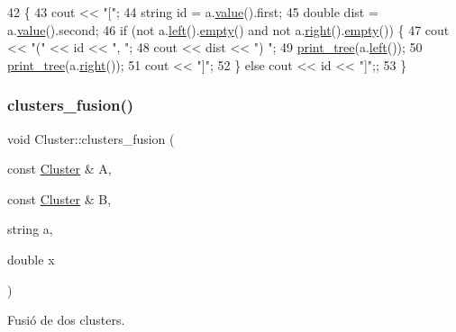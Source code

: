 \begin{DoxyCode}
42                                                              \{
43     cout << \textcolor{stringliteral}{"["};
44     \textcolor{keywordtype}{string} \textcolor{keywordtype}{id} = a.\hyperlink{class_bin_tree_a734e785b089c87b49187ee7c58edf5f3}{value}().first;
45     \textcolor{keywordtype}{double} dist = a.\hyperlink{class_bin_tree_a734e785b089c87b49187ee7c58edf5f3}{value}().second;
46     \textcolor{keywordflow}{if} (not a.\hyperlink{class_bin_tree_a82108db4c1b08d1f111027788c196d4e}{left}().\hyperlink{class_bin_tree_a74cda259ba5c25b8ee38ed4dc33e4fad}{empty}() and not a.\hyperlink{class_bin_tree_aff8e96651b27284c329667b5ad3e4d0b}{right}().\hyperlink{class_bin_tree_a74cda259ba5c25b8ee38ed4dc33e4fad}{empty}()) \{
47         cout << \textcolor{stringliteral}{"("} << \textcolor{keywordtype}{id} << \textcolor{stringliteral}{", "};
48         cout << dist << \textcolor{stringliteral}{") "};
49         \hyperlink{class_cluster_a8343114bf709fe49b69c686919d54251}{print\_tree}(a.\hyperlink{class_bin_tree_a82108db4c1b08d1f111027788c196d4e}{left}());
50         \hyperlink{class_cluster_a8343114bf709fe49b69c686919d54251}{print\_tree}(a.\hyperlink{class_bin_tree_aff8e96651b27284c329667b5ad3e4d0b}{right}());
51         cout << \textcolor{stringliteral}{"]"};
52     \} \textcolor{keywordflow}{else} cout << \textcolor{keywordtype}{id} << \textcolor{stringliteral}{"]"};;
53 \}
\end{DoxyCode}
\mbox{\label{class_cluster_a6b25af7d4f702db942878dba136fe0c2}} 
\subsubsection{\texorpdfstring{clusters\+\_\+fusion()}{clusters\_fusion()}}
{\footnotesize\ttfamily void Cluster\+::clusters\+\_\+fusion (\begin{DoxyParamCaption}\item[{const \hyperlink{class_cluster}{Cluster} \&}]{A,  }\item[{const \hyperlink{class_cluster}{Cluster} \&}]{B,  }\item[{string}]{a,  }\item[{double}]{x }\end{DoxyParamCaption})}



Fusió de dos clusters. 

